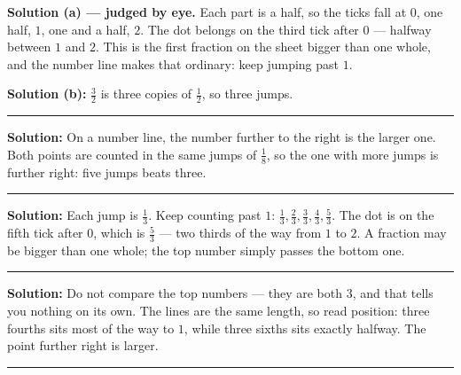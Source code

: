\documentclass[12pt]{article}
\begin{document}
\textbf{Solution (a) --- judged by eye.} Each part is a half, so the ticks fall at $0$, one half, $1$,
one and a half, $2$. The dot belongs on the third tick after $0$ --- halfway between $1$ and $2$.
This is the first fraction on the sheet bigger than one whole, and the number line makes that
ordinary: keep jumping past $1$.

\textbf{Solution (b):} $\frac{3}{2}$ is three copies of $\frac{1}{2}$, so three jumps. 

\vspace{0.15cm}\noindent\rule{\linewidth}{0.2pt}


\textbf{Solution:} On a number line, the number further to the right is the larger one. Both points
are counted in the same jumps of $\frac{1}{8}$, so the one with more jumps is further right:
five jumps beats three. 

\vspace{0.15cm}\noindent\rule{\linewidth}{0.2pt}


\textbf{Solution:} Each jump is $\frac{1}{3}$. Keep counting past $1$: $\frac{1}{3}, \frac{2}{3},
\frac{3}{3}, \frac{4}{3}, \frac{5}{3}$. The dot is on the fifth tick after $0$, which is
$\frac{5}{3}$ --- two thirds of the way from $1$ to $2$. A fraction may be bigger than one whole; the
top number simply passes the bottom one. 

\vspace{0.15cm}\noindent\rule{\linewidth}{0.2pt}


\textbf{Solution:} Do not compare the top numbers --- they are both $3$, and that tells you nothing on
its own. The lines are the same length, so read position: three fourths sits most of the way to $1$,
while three sixths sits exactly halfway. The point further right is larger. 

\vspace{0.15cm}\noindent\rule{\linewidth}{0.2pt}

\end{document}
